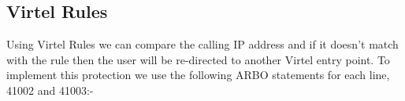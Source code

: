 \documentclass[letterpaper,10pt,english]{sphinxmanual}
\begin{document}
\ignorespaces 

\subsection{Virtel Rules}
\label{\detokenize{connectivity_guide:index-189}}\label{\detokenize{connectivity_guide:id77}}
Using Virtel Rules we can compare the calling IP address and if it doesn’t match with the rule then the user will be re-directed to another Virtel entry point. To implement this protection we use the following ARBO statements for each line, 41002 and 41003:-
\end{document}
